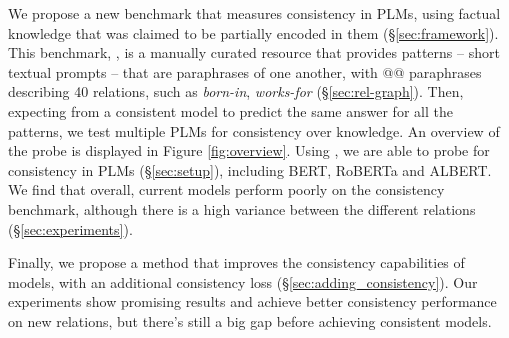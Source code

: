 We propose a new benchmark that measures consistency in PLMs, using factual knowledge that was claimed to be partially encoded in them (\S \ref{sec:framework}).
This benchmark, \resource{}, is a manually curated resource
that provides patterns -- short textual prompts -- that are paraphrases of one another, with @@ paraphrases describing 40 relations, such as \textit{born-in}, \textit{works-for} (\S \ref{sec:rel-graph}).
Then, expecting from a consistent model to predict the same answer for all the patterns, we test multiple PLMs for consistency over knowledge.
An overview of the probe is displayed in Figure \ref{fig:overview}.
Using \resource{}, we are able to probe for consistency in PLMs (\S \ref{sec:setup}), including BERT, RoBERTa and ALBERT.
We find that overall, current models perform poorly on the consistency benchmark, although there is a high variance between the different relations (\S \ref{sec:experiments}). 

Finally, we propose a method that improves the consistency capabilities of models, with an additional consistency loss (\S \ref{sec:adding_consistency}). Our experiments show promising results and achieve better consistency performance on new relations, but there's still a big gap before achieving consistent models.






